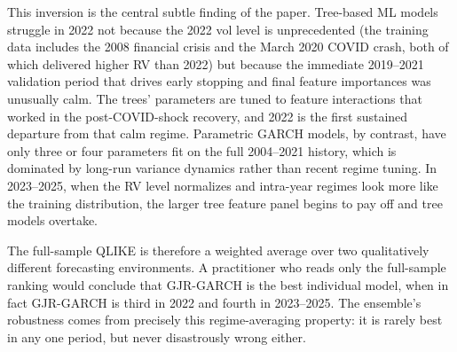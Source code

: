 This inversion is the central subtle finding of the paper. Tree-based ML models struggle in 2022 not because the 2022 vol level is unprecedented (the training data includes the 2008 financial crisis and the March 2020 COVID crash, both of which delivered higher RV than 2022) but because the immediate 2019--2021 validation period that drives early stopping and final feature importances was unusually calm. The trees' parameters are tuned to feature interactions that worked in the post-COVID-shock recovery, and 2022 is the first sustained departure from that calm regime. Parametric GARCH models, by contrast, have only three or four parameters fit on the full 2004--2021 history, which is dominated by long-run variance dynamics rather than recent regime tuning. In 2023--2025, when the RV level normalizes and intra-year regimes look more like the training distribution, the larger tree feature panel begins to pay off and tree models overtake.

The full-sample QLIKE is therefore a weighted average over two qualitatively different forecasting environments. A practitioner who reads only the full-sample ranking would conclude that GJR-GARCH is the best individual model, when in fact GJR-GARCH is third in 2022 and fourth in 2023--2025. The ensemble's robustness comes from precisely this regime-averaging property: it is rarely best in any one period, but never disastrously wrong either.
